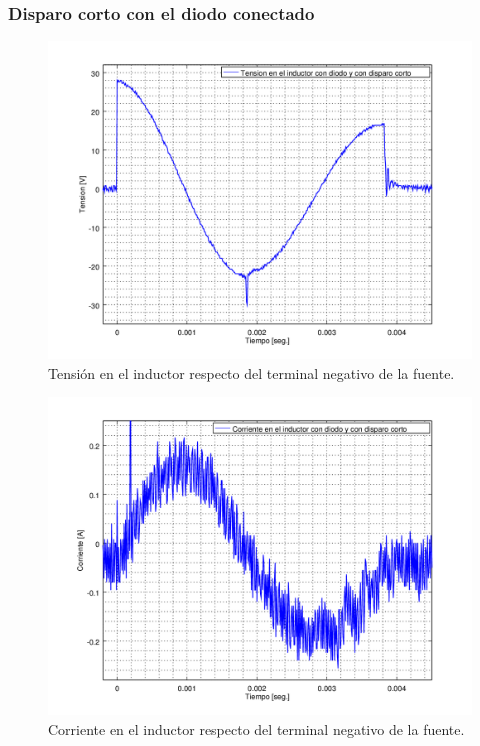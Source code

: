 \documentclass[10pt,spanish,a4paper,openany,notitlepage]{article}
\begin{document}
\subsubsection{Disparo corto con el diodo conectado}

\begin{figure}[H]
\centering
\includegraphics[scale=0.65]{./Octave/tiristores/V_L_con_diodo_disparo_corto.png}
\caption{Tensión en el inductor respecto del terminal negativo de la fuente.}
\label{fig:V_con_diodo_corto}
\end{figure}

\begin{figure}[H]
\centering
\includegraphics[scale=0.65]{./Octave/tiristores/I_L_con_diodo_disparo_corto.png}
\caption{Corriente en el inductor respecto del terminal negativo de la fuente.}
\label{fig:I_con_diodo_corto}
\end{figure}
\end{document}

